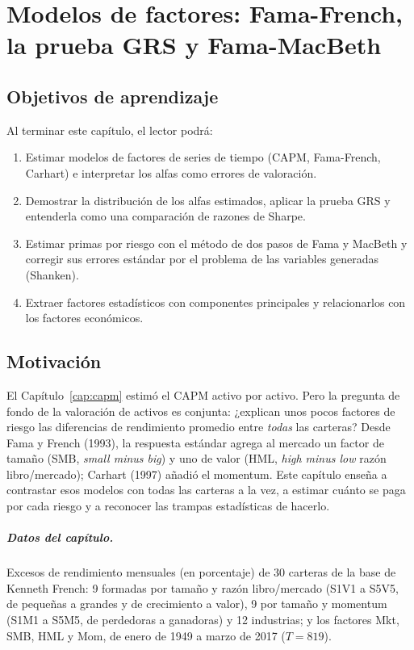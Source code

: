\chapter[Modelos de factores]{Modelos de factores: Fama-French, la prueba GRS y Fama-MacBeth}\label{cap:factores}

\section*{Objetivos de aprendizaje}
Al terminar este capítulo, el lector podrá:
\begin{enumerate}[label=\arabic*.,leftmargin=*]
  \item Estimar modelos de factores de series de tiempo (CAPM, Fama-French, Carhart) e interpretar los alfas como
        errores de valoración.
  \item Demostrar la distribución de los alfas estimados, aplicar la prueba GRS y entenderla como una comparación de
        razones de Sharpe.
  \item Estimar primas por riesgo con el método de dos pasos de Fama y MacBeth y corregir sus errores estándar
        por el problema de las variables generadas (Shanken).
  \item Extraer factores estadísticos con componentes principales y relacionarlos con los factores económicos.
\end{enumerate}

\section*{Motivación}
El Capítulo~\ref{cap:capm} estimó el CAPM activo por activo. Pero la pregunta de fondo de la valoración de activos es
conjunta: ¿explican unos pocos factores de riesgo las diferencias de rendimiento promedio entre \emph{todas} las
carteras? Desde Fama y French (1993), la respuesta estándar agrega al mercado un factor de tamaño (SMB, \emph{small
minus big}) y uno de valor (HML, \emph{high minus low} razón libro/mercado); Carhart (1997) añadió el momentum. Este
capítulo enseña a contrastar esos modelos con todas las carteras a la vez, a estimar cuánto se paga por cada riesgo y
a reconocer las trampas estadísticas de hacerlo.

\paragraph{Datos del capítulo.} Excesos de rendimiento mensuales (en porcentaje) de 30 carteras de la base de Kenneth
French: 9 formadas por tamaño y razón libro/mercado (S1V1 a S5V5, de pequeñas a grandes y de crecimiento a valor), 9
por tamaño y momentum (S1M1 a S5M5, de perdedoras a ganadoras) y 12 industrias; y los factores Mkt, SMB, HML y Mom,
de enero de 1949 a marzo de 2017 ($T=819$).


